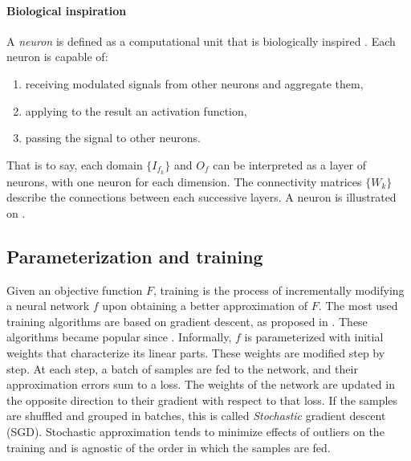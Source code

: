 \paragraph{Biological inspiration}
A \emph{neuron} is defined as a computational unit that is biologically inspired \citep{mcculloch1943logical}. Each neuron is capable of:
\begin{enumerate}
\item receiving modulated signals from other neurons and aggregate them,
\item applying to the result an activation function,
\item passing the signal to other neurons.\\
\end{enumerate}
That is to say, each domain $\{I_{f_k}\}$ and $O_f$ can be interpreted as a layer of neurons, with one neuron for each dimension. The connectivity matrices $\{W_k\}$ describe the connections between each successive layers.
A neuron is illustrated on .



\subsection{Parameterization and training}
\label{sec:training}

Given an objective function $F$, training is the process of incrementally modifying a neural network $f$ upon obtaining a better approximation of $F$.
The most used training algorithms are based on gradient descent, as proposed in \citep{widrow1960adaptive}. These algorithms became popular since \citep{rumelhart1985learning}. Informally, $f$ is parameterized with initial weights that characterize its linear parts. These weights are modified step by step. At each step, a batch of samples are fed to the network, and their approximation errors sum to a loss. The weights of the network are updated in the opposite direction to their gradient with respect to that loss. If the samples are shuffled and grouped in batches, this is called \emph{Stochastic} gradient descent (SGD). Stochastic approximation \citep{robbins1985stochastic} tends to minimize effects of outliers on the training and is agnostic of the order in which the samples are fed.


